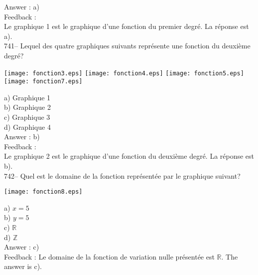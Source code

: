 \documentclass[letterpaper, 12pt]{article}
\begin{document}
Answer : a)\\

Feedback : \\
Le graphique 1 est le graphique d'une fonction du premier degr\'e.  La
r\'eponse est a).\\

741-- Lequel des quatre graphiques suivants repr\'esente une fonction du
deuxi\`eme degr\'e?\\
    \begin{center}
    \texttt{[image: fonction3.eps]}
\texttt{[image: fonction4.eps]}
\texttt{[image: fonction5.eps]}
\texttt{[image: fonction7.eps]}

    \end{center}
a) Graphique 1\\
b) Graphique 2\\
c) Graphique 3\\
d) Graphique 4\\

Answer : b)\\

Feedback : \\
Le graphique 2 est le graphique d'une fonction du deuxi\`eme degr\'e.  La
r\'eponse est b).\\

742-- Quel est le domaine de la fonction repr\'esent\'ee par le graphique
suivant?

    \begin{center}
    \texttt{[image: fonction8.eps]}
    \end{center}
a) $x=5$\\
b) $y=5$\\
c) $\mathbb{R}$\\
d) $\mathbb{Z}$\\

Answer : c)\\

Feedback :
Le domaine de la fonction de variation nulle pr\'esent\'ee est $\mathbb{R}$.
  The answer is c).\\
\end{document}
